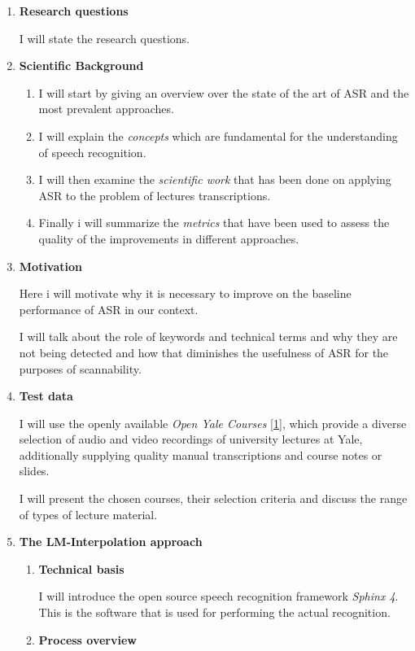 \documentclass[]{article}
\begin{document}
\begin{enumerate}
\def\labelenumi{(\arabic{enumi})}
\item
  \textbf{Research questions}

  I will state the research questions.
\item
  \textbf{Scientific Background}

  \begin{enumerate}
  \item
    I will start by giving an overview over the state of the art of ASR
    and the most prevalent approaches.
  \item
    I will explain the \emph{concepts} which are fundamental for the
    understanding of speech recognition.
  \item
    I will then examine the \emph{scientific work} that has been done on
    applying ASR to the problem of lectures transcriptions.
  \item
    Finally i will summarize the \emph{metrics} that have been used to
    assess the quality of the improvements in different approaches.
  \end{enumerate}
\item
  \textbf{Motivation}

  Here i will motivate why it is necessary to improve on the baseline
  performance of ASR in our context.

  I will talk about the role of keywords and technical terms and why
  they are not being detected and how that diminishes the usefulness of
  ASR for the purposes of scannability.
\item
  \textbf{Test data}

  I will use the openly available \emph{Open Yale Courses}
  {[}\hyperref[ref-openyale]{1}{]}, which provide a diverse selection of
  audio and video recordings of university lectures at Yale,
  additionally supplying quality manual transcriptions and course notes
  or slides.

  I will present the chosen courses, their selection criteria and
  discuss the range of types of lecture material.
\item
  \textbf{The LM-Interpolation approach}

  \begin{enumerate}
  \item
    \textbf{Technical basis}

    I will introduce the open source speech recognition framework
    \emph{Sphinx 4}. This is the software that is used for performing
    the actual recognition.
  \item
    \textbf{Process overview}


\end{enumerate}
\end{enumerate}
\end{document}
